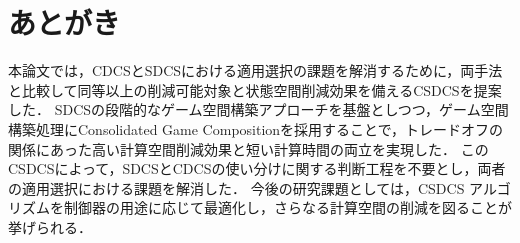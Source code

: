\section{あとがき}
\label{section:conclusion}
本論文では，CDCSとSDCSにおける適用選択の課題を解消するために，両手法と比較して同等以上の削減可能対象と状態空間削減効果を備えるCSDCSを提案した．
SDCSの段階的なゲーム空間構築アプローチを基盤としつつ，ゲーム空間構築処理にConsolidated Game Compositionを採用することで，トレードオフの関係にあった高い計算空間削減効果と短い計算時間の両立を実現した．
このCSDCSによって，SDCSとCDCSの使い分けに関する判断工程を不要とし，両者の適用選択における課題を解消した．
今後の研究課題としては，CSDCS アルゴリズムを制御器の用途に応じて最適化し，さらなる計算空間の削減を図ることが挙げられる．